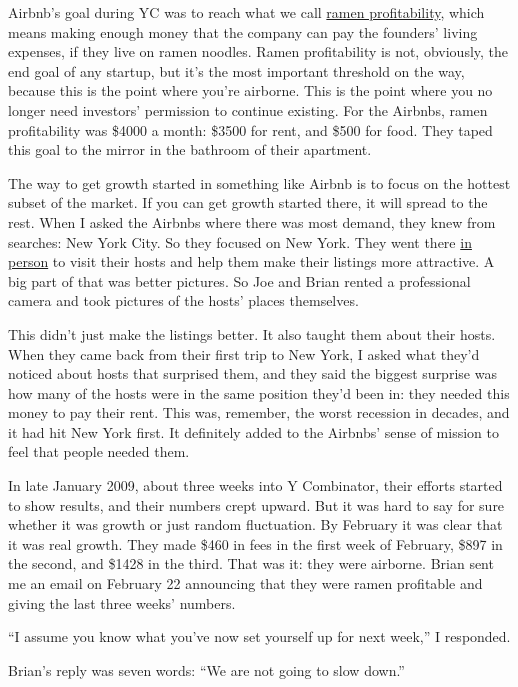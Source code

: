 \documentclass[12pt]{book}
\begin{document}
Airbnb's goal during YC was to reach what we call
\href{http://paulgraham.com/ramenprofitable.html}{ramen profitability},
which means making enough money that the company can pay the founders'
living expenses, if they live on ramen noodles. Ramen profitability is
not, obviously, the end goal of any startup, but it's the most important
threshold on the way, because this is the point where you're airborne.
This is the point where you no longer need investors' permission to
continue existing. For the Airbnbs, ramen profitability was \$4000 a
month: \$3500 for rent, and \$500 for food. They taped this goal to the
mirror in the bathroom of their apartment.

The way to get growth started in something like Airbnb is to focus on
the hottest subset of the market. If you can get growth started there,
it will spread to the rest. When I asked the Airbnbs where there was
most demand, they knew from searches: New York City. So they focused on
New York. They went there \href{http://paulgraham.com/ds.html}{in
person} to visit their hosts and help them make their listings more
attractive. A big part of that was better pictures. So Joe and Brian
rented a professional camera and took pictures of the hosts' places
themselves.

This didn't just make the listings better. It also taught them about
their hosts. When they came back from their first trip to New York, I
asked what they'd noticed about hosts that surprised them, and they said
the biggest surprise was how many of the hosts were in the same position
they'd been in: they needed this money to pay their rent. This was,
remember, the worst recession in decades, and it had hit New York first.
It definitely added to the Airbnbs' sense of mission to feel that people
needed them.

In late January 2009, about three weeks into Y Combinator, their efforts
started to show results, and their numbers crept upward. But it was hard
to say for sure whether it was growth or just random fluctuation. By
February it was clear that it was real growth. They made \$460 in fees
in the first week of February, \$897 in the second, and \$1428 in the
third. That was it: they were airborne. Brian sent me an email on
February 22 announcing that they were ramen profitable and giving the
last three weeks' numbers.

``I assume you know what you've now set yourself up for next week,'' I
responded.

Brian's reply was seven words: ``We are not going to slow down.''
\end{document}
